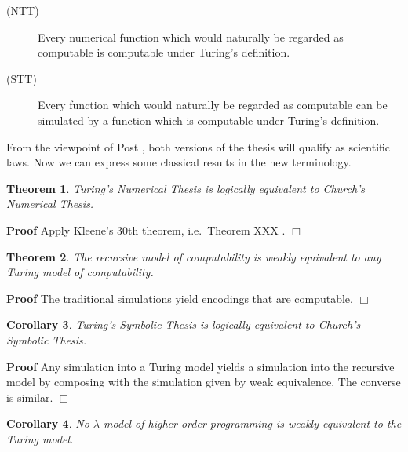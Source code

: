 \documentclass[a4paper]{article}
\newtheorem{theorem}{Theorem}
\newtheorem{corollary}[theorem]{Corollary}
\newenvironment{proof}
	{\par\noindent\upshape\textbf{Proof}\quad}
	{\hspace*{\fill}$\Box$}
\begin{document}
\begin{description}
\item[(NTT)]
  Every numerical function which would naturally be regarded as 
   computable is computable under Turing's definition.
\end{description}

\begin{description}
\item[(STT)] Every function which would naturally be regarded as
  computable can be simulated by a function which is computable under
  Turing's definition.
\end{description}

\noindent
From the viewpoint of Post \cite{post}, both versions of the thesis
will qualify as scientific laws. Now we can express some classical
results in the new terminology.





\begin{theorem}Turing's Numerical Thesis is logically equivalent to Church's Numerical Thesis.
\end{theorem}
\begin{proof}
  Apply Kleene's 30th theorem, i.e.\ Theorem XXX \cite[page 376]{Kleene52}.
\end{proof}



\begin{theorem}
\label{thm:recursive-Turing}
  The recursive model of computability is weakly equivalent to any
  Turing model of computability. 
\end{theorem}

\begin{proof}
  The traditional simulations yield encodings that are computable. 
\end{proof}

\begin{corollary}Turing's Symbolic Thesis is logically equivalent to Church's Symbolic Thesis.
\end{corollary}
\begin{proof}
  Any simulation into a Turing model yields a simulation into the
  recursive model by composing with the simulation given by weak
  equivalence. The converse is similar.
\end{proof}
 

\begin{corollary}
\label{cor:lambda-inequivalent-Turing}
No $\lambda$-model of higher-order programming is weakly equivalent to the
Turing model.
\end{corollary}
\end{document}

